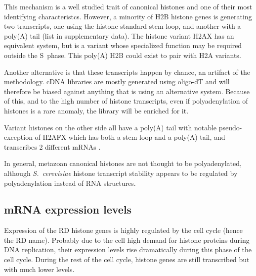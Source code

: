     This mechanism is a well studied trait of canonical histones and one of
    their most identifying characteristcs. However, a minority of H2B histone
    genes is generating two transcripts, one using the histone standard
    stem-loop, and another with a poly(A) tail (list in supplementary data).
    The histone variant H2AX has an equivalent system, but is a variant whose
    specialized function may be required outside the S~phase. This poly(A)
    H2B could exist to pair with H2A variants.


    Another alternative is that these transcripts happen by chance, an artifact
    of the methodology. cDNA libraries are mostly generated using oligo-dT
    and will therefore be biased against anything that is using an alternative
    system. Because of this, and to the high number of histone transcripts,
    even if polyadenylation of histones is a rare anomaly, the library will
    be enriched for it.

    Variant histones on the other side all have a poly(A) tail with notable
    pseudo-exception of H2AFX which has both a stem-loop and a poly(A) tail,
    and transcribes 2 different mRNAs \citep{HTwoAX-transcripts}.

    In general, metazoan canonical histones
    are not thought to be polyadenylated, although \textit{S.\ cerevisiae} histone transcript stability
    appears to be regulated by polyadenylation instead of RNA structures.




  \subsection{mRNA expression levels}
    Expression of the RD histone genes is highly regulated by the cell cycle (hence the RD name). Probably due
    to the cell high demand for histone proteins during DNA replication, their expression levels rise dramatically
    during this phase of the cell cycle. During the rest of the cell cycle, histone genes are still transcribed
    but with much lower levels.

